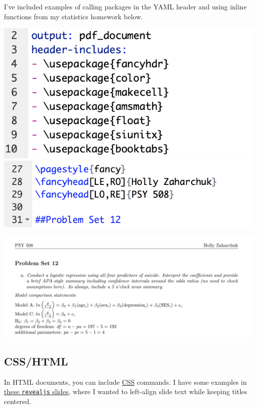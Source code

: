 \documentclass[
]{book}
\begin{document}
I've included examples of calling packages in the YAML header and using inline functions from my statistics homework below.

\includegraphics[width=8.31in]{images/latex_packages}
\includegraphics[width=9.31in]{images/latex_calls}

\includegraphics[width=18.97in]{images/latex_example}

\hypertarget{csshtml}{%
\subsection{CSS/HTML}\label{csshtml}}

In HTML documents, you can include \href{https://developer.mozilla.org/en-US/docs/Web/CSS}{CSS} commands. I have some examples in \href{https://github.com/hollzzar/markdown-tutorial/blob/master/brownbag_slides.Rmd}{these \texttt{revealjs} slides}, where I wanted to left-align slide text while keeping titles centered.
\end{document}
